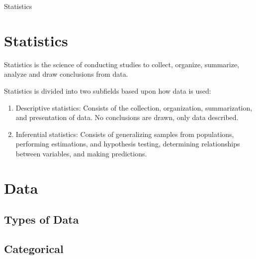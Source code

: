 \documentclass[11pt]{article}
\begin{document}
\begin{titlepage}
    \begin{center}
        \Huge Statistics
    \end{center}
\end{titlepage}

\newpage
\tableofcontents

\section{Statistics}

Statistics is the science of conducting studies to collect, organize, summarize, analyze and draw conclusions from data.

Statistics is divided into two subfields based upon how data is used:
\begin{enumerate}
    \item Descriptive statistics: Consists of the collection, organization, summarization,
        and presentation of data. No conclusions are drawn, only data described.
    \item Inferential statistics: Consists of generalizing samples from populations,
        performing estimations, and hypothesis testing, determining relationships between
        variables, and making predictions.
\end{enumerate}

\section{Data}

\subsection{Types of Data}



\subsection{Categorical}

\end{document}
